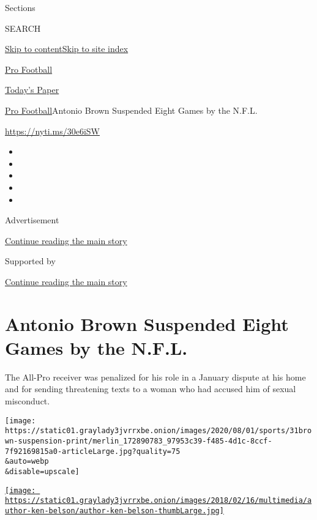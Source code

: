Sections

SEARCH

\protect\hyperlink{site-content}{Skip to
content}\protect\hyperlink{site-index}{Skip to site index}

\href{https://www.nytimes3xbfgragh.onion/section/sports/football}{Pro
Football}

\href{https://myaccount.nytimes3xbfgragh.onion/auth/login?response_type=cookie\&client_id=vi}{}

\href{https://www.nytimes3xbfgragh.onion/section/todayspaper}{Today's
Paper}

\href{/section/sports/football}{Pro Football}\textbar{}Antonio Brown
Suspended Eight Games by the N.F.L.

\url{https://nyti.ms/30e6iSW}

\begin{itemize}
\item
\item
\item
\item
\item
\end{itemize}

Advertisement

\protect\hyperlink{after-top}{Continue reading the main story}

Supported by

\protect\hyperlink{after-sponsor}{Continue reading the main story}

\hypertarget{antonio-brown-suspended-eight-games-by-the-nfl}{%
\section{Antonio Brown Suspended Eight Games by the
N.F.L.}\label{antonio-brown-suspended-eight-games-by-the-nfl}}

The All-Pro receiver was penalized for his role in a January dispute at
his home and for sending threatening texts to a woman who had accused
him of sexual misconduct.

\texttt{[image: https://static01.graylady3jvrrxbe.onion/images/2020/08/01/sports/31brown-suspension-print/merlin\_172890783\_97953c39-f485-4d1c-8ccf-7f92169815a0-articleLarge.jpg?quality=75\\\&auto=webp\\\&disable=upscale]}

\href{https://www.nytimes3xbfgragh.onion/by/ken-belson}{\texttt{[image: https://static01.graylady3jvrrxbe.onion/images/2018/02/16/multimedia/author-ken-belson/author-ken-belson-thumbLarge.jpg]}}

